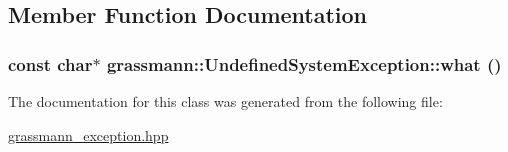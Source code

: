 \subsection{Member Function Documentation}
\hypertarget{classgrassmann_1_1UndefinedSystemException_76a73a49fcec77afdb34d83c1e9b3916}{
\subsubsection[what]{\setlength{\rightskip}{0pt plus 5cm}const char$\ast$ grassmann::UndefinedSystemException::what ()}}
\label{classgrassmann_1_1UndefinedSystemException_76a73a49fcec77afdb34d83c1e9b3916}




The documentation for this class was generated from the following file:\begin{CompactItemize}
\item 
\hyperlink{grassmann__exception_8hpp}{grassmann\_\-exception.hpp}\end{CompactItemize}
